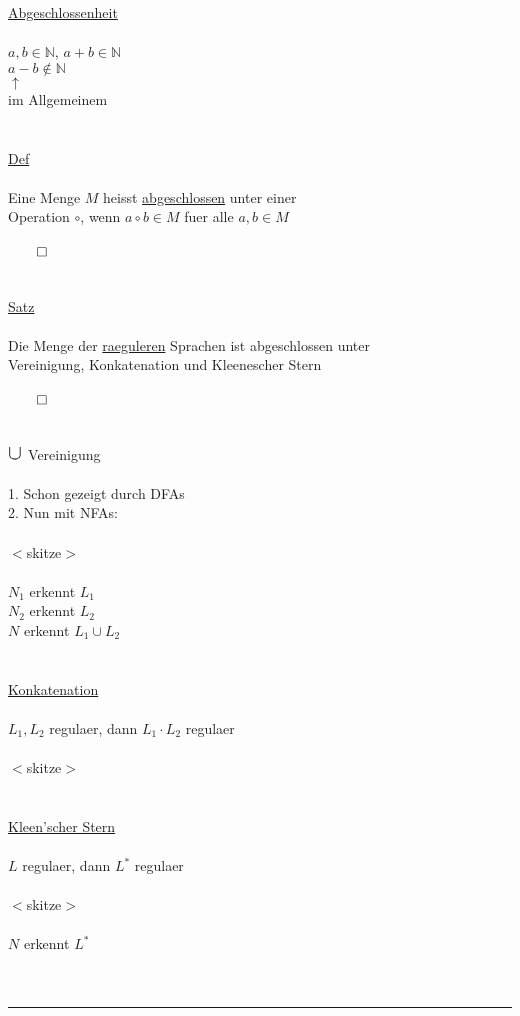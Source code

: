 \documentclass[18pt,a4paper]{scrreprt}
\newcommand{\tab}{\hspace*{2em}}
\begin{document}
\uline{Abgeschlossenheit}\\
\\
$a,b \in \mathbb{N}$, $a+b \in \mathbb{N}$\\
\tab $a-b \not\in \mathbb{N}$\\
\tab \tab \:\: $\uparrow$\\
\tab \tab \:\: im Allgemeinem\\
\\
\\
\uline{Def}\\
\\
Eine Menge $M$ heisst \uline{abgeschlossen} unter einer\\
Operation $\circ$, wenn $a \circ b \in M$ fuer alle $a,b \in M$\\
\\
$\qed$\\
\\
\\
\uline{Satz}\\
\\
Die Menge der \uline{raeguleren} Sprachen ist abgeschlossen unter\\ 
Vereinigung, Konkatenation und Kleenescher Stern\\
\\
$\qed$\\
\\
\\
$\scalebox{1.5}{$\cup$}$ Vereinigung\\
\\
1. Schon gezeigt durch DFAs\\
2. Nun mit NFAs:\\
\\
$<$skitze$>$\\
\\
$N_1$ erkennt $L_1$\\
$N_2$ erkennt $L_2$\\
$N$ erkennt $L_1 \cup L_2$\\
\\
\\
\uline{Konkatenation}\\
\\
$L_1, L_2$ regulaer, dann $L_1 \cdot L_2$ regulaer\\
\\
$<$skitze$>$\\
\\
\\
\uline{Kleen'scher Stern}\\
\\
$L$ regulaer, dann $L^*$ regulaer\\
\\
$<$skitze$>$\\
\\
$N$ erkennt $L^*$\\
\\
\\
\rule{\textwidth}{0.4mm}\\
\\
\end{document}
